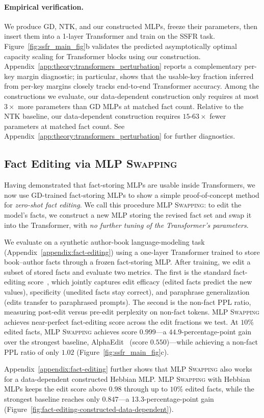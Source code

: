 \paragraph{Empirical verification.}
We produce GD, NTK, and our constructed MLPs, freeze their parameters, then insert them into a 1-layer Transformer and train on the SSFR task.
Figure~\ref{fig:ssfr_main_fig}b validates the predicted asymptotically optimal capacity scaling for Transformer blocks using our construction.
Appendix~\ref{app:theory:transformers_perturbation} reports a complementary per-key margin diagnostic; in particular,  shows that the usable-key fraction inferred from per-key margins closely tracks end-to-end Transformer accuracy.
Among the constructions we evaluate, our data-dependent construction only requires at most $3\times$ more parameters than GD MLPs at matched fact count. Relative to the NTK baseline, our data-dependent construction requires $15$-$63\times$ fewer parameters at matched fact count. See Appendix~\ref{app:theory:transformers_perturbation} for further diagnostics.



\subsection{Fact Editing via \textsc{MLP Swapping}}
\label{sec:fact-editing}

Having demonstrated that fact-storing MLPs are usable inside Transformers, we now use GD-trained fact-storing MLPs to show a simple proof-of-concept method for \emph{zero-shot fact editing}. We call this procedure \textsc{MLP Swapping}: to edit the model's facts, we construct a new MLP storing the revised fact set and swap it into the Transformer, with \emph{no further tuning of the Transformer's parameters}.

We evaluate on a synthetic author-book language-modeling task (Appendix~\ref{appendix:fact-editing}) using a one-layer Transformer trained to store book--author facts through a frozen fact-storing MLP.
After training, we edit a subset of stored facts and evaluate two metrics. The first is the standard fact-editing score~\citep{memit}, which jointly captures edit efficacy (edited facts predict the new values), specificity (unedited facts stay correct), and paraphrase generalization (edits transfer to paraphrased prompts). The second is the non-fact PPL ratio, measuring post-edit versus pre-edit perplexity on non-fact tokens.
\textsc{MLP Swapping} achieves near-perfect fact-editing score across the edit fractions we test.
At $10\%$ edited facts, \textsc{MLP Swapping} achieves score $0.999$---a $44.9$-percentage-point gain over the strongest baseline, AlphaEdit~\citep{fang2025alphaeditnullspaceconstrainedknowledge} (score $0.550$)---while achieving a non-fact PPL ratio of only $1.02$ (Figure~\ref{fig:ssfr_main_fig}c).

Appendix~\ref{appendix:fact-editing} further shows that \textsc{MLP Swapping} also works for a data-dependent constructed Hebbian MLP.
\textsc{MLP Swapping} with Hebbian MLPs keeps the edit score above \(0.98\) through up to \(10\%\) edited facts, while the strongest baseline reaches only \(0.847\)---a 13.3-percentage-point gain (Figure~\ref{fig:fact-editing-constructed-data-dependent}).
